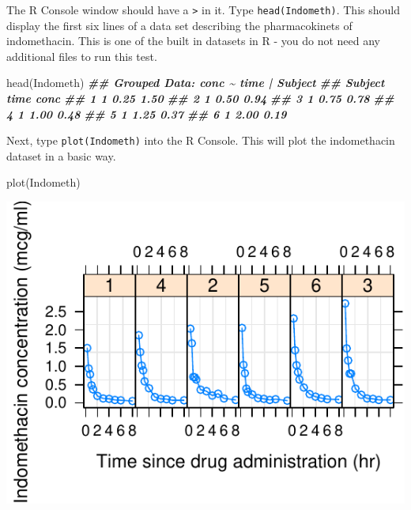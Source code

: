 \documentclass[
]{krantz}
\newenvironment{Shaded}{\begin{snugshade}}{\end{snugshade}}
\newcommand{\DocumentationTok}[1]{\textcolor[rgb]{0.56,0.35,0.01}{\textbf{\textit{#1}}}}
\newcommand{\FunctionTok}[1]{\textcolor[rgb]{0.00,0.00,0.00}{#1}}
\newcommand{\NormalTok}[1]{#1}
\begin{document}
The R Console window should have a \texttt{\textgreater{}} in it. Type \texttt{head(Indometh)}. This should display the first six lines of a data set describing the pharmacokinets of indomethacin. This is one of the built in datasets in R - you do not need any additional files to run this test.

\begin{Shaded}
\begin{Highlighting}[]
\FunctionTok{head}\NormalTok{(Indometh)}
\DocumentationTok{\#\# Grouped Data: conc \textasciitilde{} time | Subject}
\DocumentationTok{\#\#   Subject time conc}
\DocumentationTok{\#\# 1       1 0.25 1.50}
\DocumentationTok{\#\# 2       1 0.50 0.94}
\DocumentationTok{\#\# 3       1 0.75 0.78}
\DocumentationTok{\#\# 4       1 1.00 0.48}
\DocumentationTok{\#\# 5       1 1.25 0.37}
\DocumentationTok{\#\# 6       1 2.00 0.19}
\end{Highlighting}
\end{Shaded}

Next, type \texttt{plot(Indometh)} into the R Console. This will plot the indomethacin dataset in a basic way.

\begin{Shaded}
\begin{Highlighting}[]
\FunctionTok{plot}\NormalTok{(Indometh)}
\end{Highlighting}
\end{Shaded}

\begin{center}\includegraphics[width=1\linewidth]{index_files/figure-latex/unnamed-chunk-6-1} \end{center}
\end{document}
